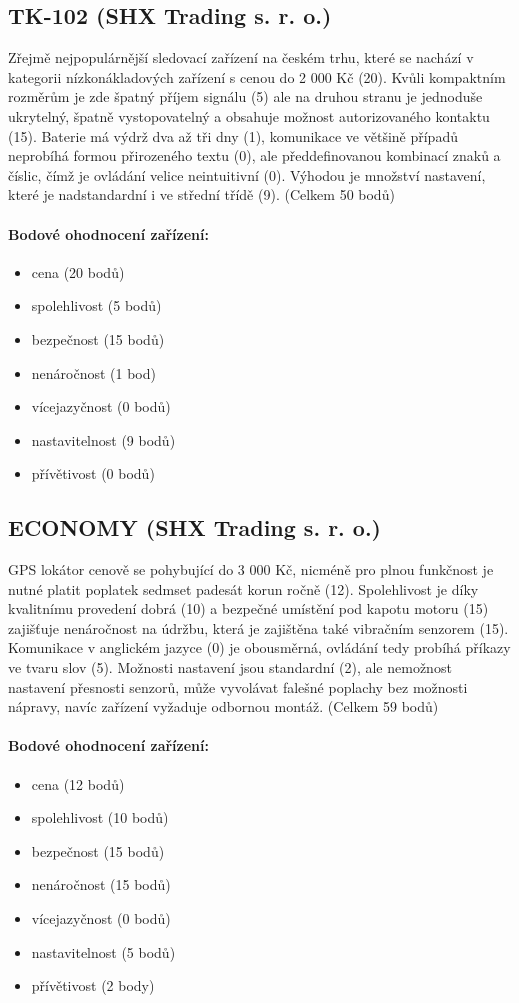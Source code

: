 \documentclass[FM,MP]{tulthesis}  %
\begin{document}
\subsection{TK-102 (SHX Trading s. r. o.)}
Zřejmě nejpopulárnější sledovací zařízení na českém trhu, které se nachází v kategorii nízkonákladových zařízení s cenou do 2 000 Kč (20). Kvůli kompaktním rozměrům je zde špatný příjem signálu (5) ale na druhou stranu je jednoduše ukrytelný, špatně vystopovatelný a obsahuje možnost autorizovaného kontaktu (15). Baterie má výdrž dva až tři dny (1), komunikace ve většině případů neprobíhá formou přirozeného textu (0), ale předdefinovanou kombinací znaků a číslic, čímž je ovládání velice neintuitivní (0). Výhodou je množství nastavení, které je nadstandardní i ve střední třídě (9). (Celkem 50 bodů)

\paragraph{Bodové ohodnocení zařízení:}
\begin{itemize}
\item cena (20 bodů)
\item spolehlivost (5 bodů)
\item bezpečnost (15 bodů)
\item nenáročnost (1 bod)
\item vícejazyčnost (0 bodů)
\item nastavitelnost (9 bodů)
\item přívětivost (0 bodů)
\end{itemize}

\subsection{ECONOMY (SHX Trading s. r. o.)}
GPS lokátor cenově se pohybující do 3 000 Kč, nicméně pro plnou funkčnost je nutné platit poplatek sedmset padesát korun ročně (12). Spolehlivost je díky kvalitnímu provedení dobrá (10) a bezpečné umístění pod kapotu motoru (15) zajišťuje nenáročnost na údržbu, která je zajištěna také vibračním senzorem (15). Komunikace v anglickém jazyce (0) je obousměrná, ovládání tedy probíhá příkazy ve tvaru slov (5). Možnosti nastavení jsou standardní (2), ale nemožnost nastavení přesnosti senzorů, může vyvolávat falešné poplachy bez možnosti nápravy, navíc zařízení vyžaduje odbornou montáž. (Celkem 59 bodů)

\paragraph{Bodové ohodnocení zařízení:}
\begin{itemize}
\item cena (12 bodů)
\item spolehlivost (10 bodů)
\item bezpečnost (15 bodů)
\item nenáročnost (15 bodů)
\item vícejazyčnost (0 bodů)
\item nastavitelnost (5 bodů)
\item přívětivost (2 body)
\end{itemize}
\end{document}
